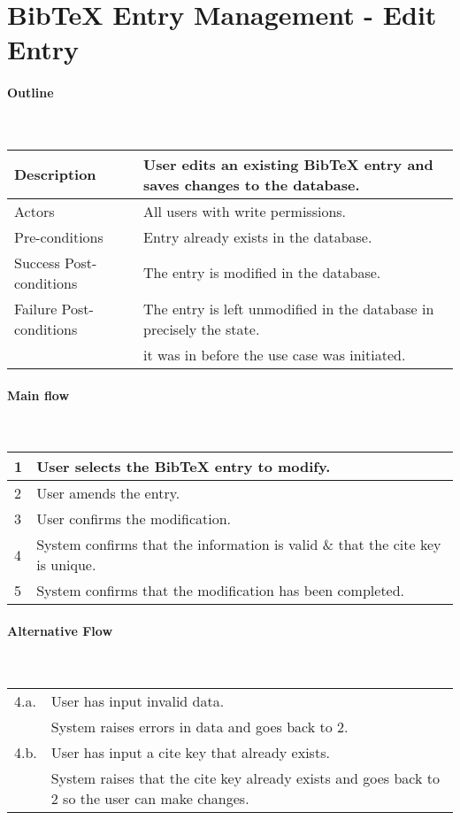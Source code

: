 \section*{BibTeX Entry Management - Edit Entry} %

\paragraph*{Outline} \

\begin{tabular}{ | l | l | }
\hline
Description & User edits an existing BibTeX entry and saves changes to the database. \\ \hline
Actors & All users with write permissions. \\ \hline
Pre-conditions & Entry already exists in the database. \\ \hline
Success Post-conditions & The entry is modified in the database. \\ \hline
Failure Post-conditions & The entry is left unmodified in the database in precisely the state. \\
 & it was in before the use case was initiated. \\ \hline
\end{tabular}


\paragraph*{Main flow} \

\begin{tabular}{ | l | l | } \hline
1 & User selects the BibTeX entry to modify. \\ \hline
2 & User amends the entry. \\ \hline
3 & User confirms the modification. \\ \hline
4 & System confirms that the information is valid \& that the cite key is unique. \\ \hline
5 & System confirms that the modification has been completed. \\ \hline
\end{tabular}


\paragraph*{Alternative Flow} \

\begin{tabular}{ | l | l | } \hline
4.a. & User has input invalid data. \\
     & System raises errors in data and goes back to 2. \\ \hline
4.b. & User has input a cite key that already exists. \\
     & System raises that the cite key already exists and goes back to 2 so the user can make changes. \\ \hline
\end{tabular}

